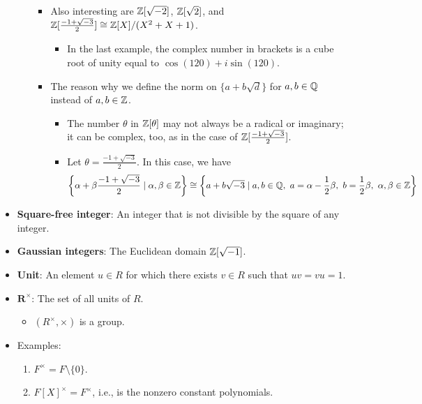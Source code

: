 \documentclass[../notes.tex]{subfiles}
\begin{document}
\begin{itemize}
\begin{enumerate}
\begin{itemize}
            \item Also interesting are $\mathbb{Z}[\sqrt{-2}]$, $\mathbb{Z}[\sqrt{2}]$, and $\mathbb{Z}[\frac{-1+\sqrt{-3}}{2}]\cong\mathbb{Z}[X]/(X^2+X+1)$.
            \begin{itemize}
                \item In the last example, the complex number in brackets is a cube root of unity equal to $\cos(120)+i\sin(120)$.
            \end{itemize}
            \item The reason why we define the norm on $\{a+b\sqrt{d}\}$ for $a,b\in\mathbb{Q}$ instead of $a,b\in\mathbb{Z}$.
            \begin{itemize}
                \item The number $\theta$ in $\mathbb{Z}[\theta]$ may not always be a radical or imaginary; it can be complex, too, as in the case of $\mathbb{Z}[\frac{-1+\sqrt{-3}}{2}]$.
                \item Let $\theta=\frac{-1+\sqrt{-3}}{2}$. In this case, we have
                \begin{equation*}
                    \left\{ \alpha+\beta\frac{-1+\sqrt{-3}}{2}\mid\alpha,\beta\in\Z \right\} \cong \left\{ a+b\sqrt{-3}\mid a,b\in\Q,\ a=\alpha-\frac{1}{2}\beta,\ b=\frac{1}{2}\beta,\ \alpha,\beta\in\Z \right\}
                \end{equation*}
            \end{itemize}
        \end{itemize}
    \end{enumerate}
    \item \textbf{Square-free integer}: An integer that is not divisible by the square of any integer.
    \item \textbf{Gaussian integers}: The Euclidean domain $\mathbb{Z}[\sqrt{-1}]$.
    \item \textbf{Unit}: An element $u\in R$ for which there exists $v\in R$ such that $uv=vu=1$.
    \item $\bm{R^\times}$: The set of all units of $R$.
    \begin{itemize}
        \item $(R^\times,\times)$ is a group.
    \end{itemize}
    \item Examples:
    \begin{enumerate}
        \item $F^\times=F\setminus\{0\}$.
        \item $F[X]^\times=F^\times$, i.e., is the nonzero constant polynomials.
        \begin{itemize}

\end{itemize}
\end{enumerate}
\end{itemize}
\end{document}
